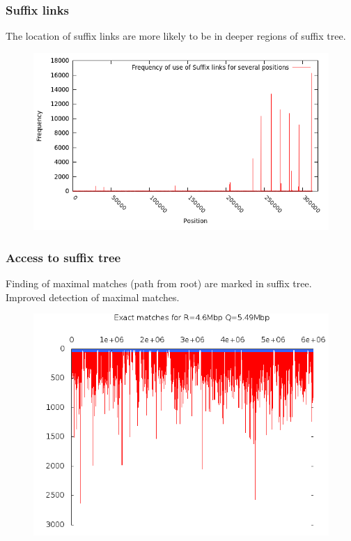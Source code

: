 \documentclass{beamer}
\begin{document}
\begin{frame}
  \frametitle{Suffix links}
  \begin{block}{}
    The location of suffix links are more likely to be in deeper regions of suffix tree.
  \end{block}
  \begin{figure}\includegraphics[scale=0.4]{histogram.png}\end{figure}
\end{frame}
\begin{frame}
  \frametitle{Access to suffix tree}
  \begin{block}{}
    Finding of maximal matches (path from root) are marked in suffix tree.\\
    Improved detection of maximal matches.
  \end{block}
  \begin{figure}
    \includegraphics[scale=0.38]{freq.png}
  \end{figure}
\end{frame}
\end{document}
